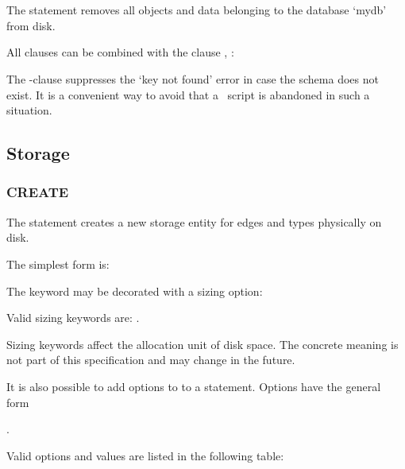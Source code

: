  \\
 \\
 

The statement removes all objects and data
belonging to the database `mydb' from disk.

All  clauses can be combined
with the clause , \eg:

  

The -clause
suppresses the `key not found' error
in case the schema
does not exist.
It is a convenient way to avoid
that a \sql\ script is abandoned
in such a situation.


\subsection{Storage}
\subsubsection{CREATE}
The  statement
creates a new storage entity for edges and types
physically on disk.

The simplest form is:

 

The keyword  may be decorated
with a sizing option:

 

Valid sizing keywords are:
.

Sizing keywords affect the allocation unit
of disk space. The concrete meaning is not
part of this specification and may change
in the future.

It is also possible to add options to
to a  statement.
Options have the general form

.

Valid options and values are listed in the following table:

